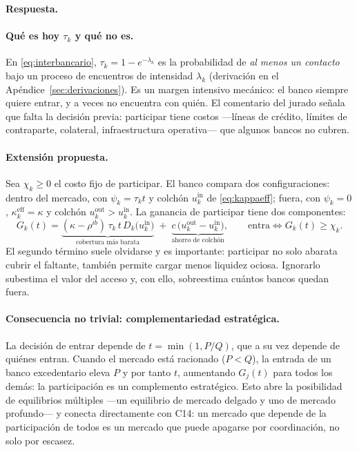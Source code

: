 \documentclass[11pt]{article}
\newcommand{\resp}{\par\noindent\textbf{Respuesta.}\par}
\newcommand{\keff}{\kappa^{\mathrm{eff}}}
\theoremstyle{definition}
\begin{document}
\resp

\paragraph{Qu\'e es hoy $\tau_k$ y qu\'e no es.} En \eqref{eq:interbancario},
$\tau_k=1-e^{-\lambda_k}$ es la probabilidad de \emph{al menos un contacto} bajo
un proceso de encuentros de intensidad $\lambda_k$ (derivaci\'on en el
Ap\'endice~\ref{sec:derivaciones}). Es un margen intensivo mec\'anico: el banco
siempre quiere entrar, y a veces no encuentra con qui\'en. El comentario del
jurado se\~nala que falta la decisi\'on previa: participar tiene costos
---l\'ineas de cr\'edito, l\'imites de contraparte, colateral, infraestructura
operativa--- que algunos bancos no cubren.

\paragraph{Extensi\'on propuesta.} Sea $\chi_k\ge0$ el costo fijo de participar.
El banco compara dos configuraciones: dentro del mercado, con
$\psi_k=\tau_k t$ y colch\'on $u^{\mathrm{in}}_k$ de \eqref{eq:kappaeff}; fuera,
con $\psi_k=0$, $\keff_k=\kappa$ y colch\'on $u^{\mathrm{out}}_k>u^{\mathrm{in}}_k$.
La ganancia de participar tiene dos componentes:
\begin{equation}
G_k(t)=\underbrace{(\kappa-\rho^{ib})\,\tau_k\,t\,D_k\big(u^{\mathrm{in}}_k\big)}_{\text{cobertura m\'as barata}}
\;+\;\underbrace{c\,\big(u^{\mathrm{out}}_k-u^{\mathrm{in}}_k\big)}_{\text{ahorro de colch\'on}},
\qquad
\text{entra}\iff G_k(t)\ge\chi_k.
\label{eq:entrada}
\end{equation}
El segundo t\'ermino suele olvidarse y es importante: participar no solo abarata
cubrir el faltante, tambi\'en permite cargar menos liquidez ociosa. Ignorarlo
subestima el valor del acceso y, con ello, sobreestima cu\'antos bancos quedan
fuera.

\paragraph{Consecuencia no trivial: complementariedad estrat\'egica.} La decisi\'on
de entrar depende de $t=\min(1,P/Q)$, que a su vez depende de qui\'enes entran.
Cuando el mercado est\'a racionado ($P<Q$), la entrada de un banco excedentario
eleva $P$ y por tanto $t$, aumentando $G_j(t)$ para todos los dem\'as: la
participaci\'on es un complemento estrat\'egico. Esto abre la posibilidad de
equilibrios m\'ultiples ---un equilibrio de mercado delgado y uno de mercado
profundo--- y conecta directamente con C14: un mercado que depende de la
participaci\'on de todos es un mercado que puede apagarse por coordinaci\'on, no
solo por escasez.
\end{document}
